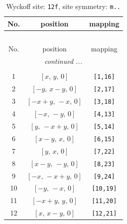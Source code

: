 \documentclass[fleqn,8pt]{jsarticle}
\begin{document}
\begin{longtable}{ccc}
\caption{Wyckoff site: {\tt 12f}, site symmetry: {\tt m..}}
 \\
 \hline \hline
No. & position & mapping \\ \hline \endfirsthead

\multicolumn{2}{l}{\tablename\ \thetable{}} \\
 \hline \hline
No. & position & mapping \\ \hline \endhead

 \hline \hline
\multicolumn{2}{r}{\footnotesize\it continued ...} \\ \endfoot

 \hline \hline
\multicolumn{2}{r}{} \\ \endlastfoot

1 & $\left[ x,\, y,\, 0 \right]$ & {\tt [1,16]} \\ \hline
2 & $\left[ - y,\, x - y,\, 0 \right]$ & {\tt [2,17]} \\ \hline
3 & $\left[ - x + y,\, - x,\, 0 \right]$ & {\tt [3,18]} \\ \hline
4 & $\left[ - x,\, - y,\, 0 \right]$ & {\tt [4,13]} \\ \hline
5 & $\left[ y,\, - x + y,\, 0 \right]$ & {\tt [5,14]} \\ \hline
6 & $\left[ x - y,\, x,\, 0 \right]$ & {\tt [6,15]} \\ \hline
7 & $\left[ y,\, x,\, 0 \right]$ & {\tt [7,22]} \\ \hline
8 & $\left[ x - y,\, - y,\, 0 \right]$ & {\tt [8,23]} \\ \hline
9 & $\left[ - x,\, - x + y,\, 0 \right]$ & {\tt [9,24]} \\ \hline
10 & $\left[ - y,\, - x,\, 0 \right]$ & {\tt [10,19]} \\ \hline
11 & $\left[ - x + y,\, y,\, 0 \right]$ & {\tt [11,20]} \\ \hline
12 & $\left[ x,\, x - y,\, 0 \right]$ & {\tt [12,21]} \\
\end{longtable}
\renewcommand{\arraystretch}{1.2}
\end{document}
